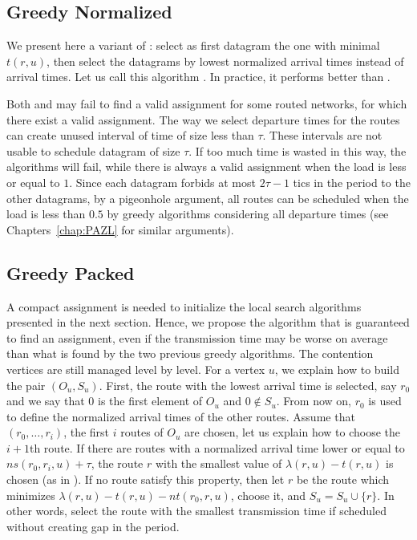 \subsection{Greedy Normalized}

We present here a variant of \greedydeadline: select as first datagram the one with minimal $t(r,u)$, then select the datagrams by lowest normalized arrival times instead of arrival times. Let us call this algorithm
\greedynormalized. In practice, it performs better than \greedydeadline.

Both \greedydeadline and \greedynormalized may fail to find a valid assignment for some routed networks, for which there exist a valid assignment. The way we select departure times for the routes can create unused interval of time of size less than $\tau$. These intervals are not usable to schedule datagram of size $\tau$. If too much time is wasted in this way, the algorithms will fail, while there is always a valid assignment when the load is less or equal to $1$. Since each datagram forbids at most $2\tau -1$ tics in the period to the other datagrams, by a pigeonhole argument, all routes can be scheduled when the load is less than $0.5$ by greedy algorithms considering all departure times (see Chapters~\ref{chap:PAZL} for similar arguments).



\subsection{Greedy Packed}


A compact assignment is needed to initialize the local search algorithms presented in the next section. Hence, we propose the \greedypacked algorithm that is guaranteed to find an assignment, even if the transmission time may be worse on average than what is found by the two previous greedy algorithms.
The contention vertices are still managed level by level. For a vertex $u$, we explain how to build the pair $(O_u,S_u)$. First, the route with the lowest arrival time is selected, say $r_0$ and we say that $0$ is the first element of $O_u$ and $0 \notin S_u$. From now on, $r_0$ is used to define the normalized arrival times of the other routes. Assume that $(r_0,\dots,r_i)$, the first $i$ routes of $O_u$ are chosen, let us explain how to choose the $i+1$th route. If there are routes with a normalized arrival time lower or equal to $ns(r_0,r_i,u)+\tau$, the route $r$ with the smallest value of $\lambda(r,u) - t(r,u)$ is chosen (as in \greedynormalized). If no route satisfy this property, then let $r$ be the route which minimizes $\lambda(r,u) - t(r,u) - nt(r_0,r,u)$, choose it, and $S_u = S_u \cup \{r\}$. In other words, select the route with the smallest transmission time if scheduled without creating gap in the period.


